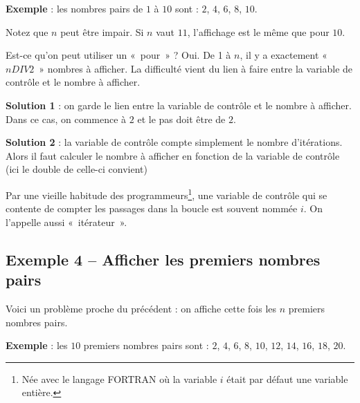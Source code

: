		\textbf{Exemple} : 
		les nombres pairs de $1$ à $10$ sont : $2$, $4$, $6$, $8$, $10$.
		
		Notez que $n$ peut être impair. Si $n$ vaut $11$, 
		l'affichage est le même que pour $10$.

		Est-ce qu'on peut utiliser un «~pour~» ? 
		Oui. De 1 à $n$, il y a exactement «~$n DIV 2$~» nombres à afficher. 
		La difficulté vient du lien à faire entre la variable de
		contrôle et le nombre à afficher.

		\textbf{Solution 1} : 
		on garde le lien entre la variable de contrôle 
		et le nombre à afficher. 
		Dans ce cas, on commence à $2$ et le pas doit être de $2$.


		\textbf{Solution 2} : 
		la variable de contrôle compte simplement le nombre d'itérations.
		Alors il faut calculer le nombre à afficher en fonction de la variable
		de contrôle (ici le double de celle-ci convient)


		Par une vieille habitude des programmeurs\footnote{Née avec 
		le langage FORTRAN où la variable $i$ était par défaut une variable entière.},
		une variable de contrôle qui se contente de compter les passages dans
		la boucle est souvent nommée $i$. 
		On l'appelle aussi «~itérateur~».

	\subsection{Exemple 4 -- Afficher les premiers nombres pairs}

		Voici un problème proche du précédent : 
		on affiche cette fois les $n$ premiers nombres pairs.
		
		\textbf{Exemple} : 
		les $10$ premiers nombres pairs sont : $2$, $4$, $6$, $8$, $10$, $12$, $14$, $16$, $18$, $20$.
		
